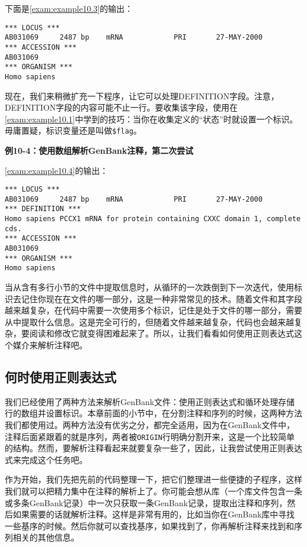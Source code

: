 下面是\autoref{exam:example10.3}的输出：

\begin{lstlisting}
*** LOCUS ***
AB031069     2487 bp    mRNA            PRI       27-MAY-2000
*** ACCESSION ***
AB031069
*** ORGANISM ***
Homo sapiens
\end{lstlisting}

现在，我们来稍微扩充一下程序，让它可以处理DEFINITION字段。注意，DEFINITION字段的内容可能不止一行。要收集该字段，使用在\autoref{exam:example10.1}中学到的技巧：当你在收集定义的“状态”时就设置一个标识。毋庸置疑，标识变量还是叫做\verb|$flag|。

\textbf{例10-4：使用数组解析GenBank注释，第二次尝试}


\autoref{exam:example10.4}的输出：

\begin{lstlisting}
*** LOCUS ***
AB031069     2487 bp    mRNA            PRI       27-MAY-2000
*** DEFINITION ***
Homo sapiens PCCX1 mRNA for protein containing CXXC domain 1, complete
cds.
*** ACCESSION ***
AB031069
*** ORGANISM ***
Homo sapiens
\end{lstlisting}

当从含有多行小节的文件中提取信息时，从循环的一次跌倒到下一次迭代，使用标识去记住你现在在文件的哪一部分，这是一种非常常见的技术。随着文件和其字段越来越复杂，在代码中需要一次使用多个标识，记住是处于文件的哪一部分，需要从中提取什么信息。这是完全可行的，但随着文件越来越复杂，代码也会越来越复杂，要阅读和修改它就变得困难起来了。所以，让我们看看如何使用正则表达式这个媒介来解析注释吧。

\subsection{何时使用正则表达式}
我们已经使用了两种方法来解析GenBank文件：使用正则表达式和循环处理存储行的数组并设置标识。本章前面的小节中，在分割注释和序列的时候，这两种方法我们都使用过。两种方法没有优劣之分，都完全适用，因为在GenBank文件中，注释后面紧跟着的就是序列，两者被\verb|ORIGIN|行明确分割开来，这是一个比较简单的结构。然而，要解析注释看起来就要复杂一些了，因此，让我尝试使用正则表达式来完成这个任务吧。

作为开始，我们先把先前的代码整理一下，把它们整理进一些便捷的子程序，这样我们就可以把精力集中在注释的解析上了。你可能会想从库（一个库文件包含一条或多条GenBank记录）中一次只获取一条GenBank记录，提取出注释和序列，然后如果需要的话就解析注释。这样是非常有用的，比如当你在GenBank库中寻找一些基序的时候。然后你就可以查找基序，如果找到了，你再解析注释来找到和序列相关的其他信息。

